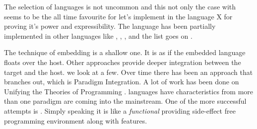 \documentclass[thesis-solanki.tex]{subfiles}
\begin{document}
The selection of languages is not uncommon and this not only the case with  seems 
to be the all time favourite for let's implement  in the language X for proving it's power and 
expressibility. The  language has been partially implemented \cite{swipembedd} in other 
languages like  \cite{racklog},   
\cite{komorowski1982qlog,robinson1982loglisp,robinson1980loglisp},  \cite{wikiprolog, jlog}, 
 \cite{jscriptlog} and the list \cite{yieldprolog} goes on .

The technique of embedding is a shallow one.
It is as if the embedded language floats over the host.
Other approaches provide deeper integration between the target and the host.
we look at a few.
Over time there has been an approach that branches out, which is Paradigm Integration.
A lot of work has been done on Unifying the Theories of Programming
\cite{DBLP:conf/utp/2006,DBLP:conf/utp/2008,DBLP:conf/utp/2010,DBLP:conf/utp/2012,hoare1998unifying,
  gibbons2013unifying}.
 languages  have characteristics from more than one paradigm are coming into the
mainstream.
One of the more successful attempts is \cite{website:scala}. Simply speaking it is like a \textit{functional} 
 providing side-effect free programming environment along with 
 features.
\end{document}
